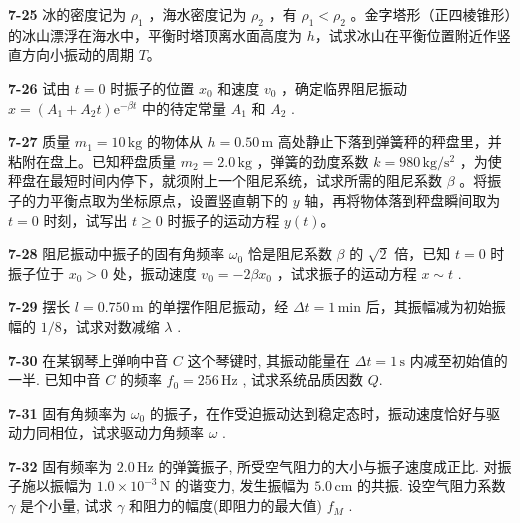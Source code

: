 \newpage

\textbf{7-25} 冰的密度记为 $\rho_{1}$ ，海水密度记为 $\rho_{2}$ ，有 $\rho_{1}<\rho_{2}$ 。金字塔形（正四棱锥形）的冰山漂浮在海水中，平衡时塔顶离水面高度为 $h$，试求冰山在平衡位置附近作竖直方向小振动的周期 $T$。

\newpage

\textbf{7-26} 试由 $t=0$ 时振子的位置 $x_{0}$ 和速度 $v_{0}$ ，确定临界阻尼振动 $x=(A_{1}+A_{2}t)\mathrm{e}^{-\beta t}$ 中的待定常量 $A_{1}$ 和 $A_{2}$ .

\newpage

\textbf{7-27} 质量 $m_{1}=10\,\mathrm{kg}$ 的物体从 $h=0.50\,\mathrm m$ 高处静止下落到弹簧秤的秤盘里，并粘附在盘上。已知秤盘质量 $m_{2}=2.0\,\mathrm{kg}$ ，弹簧的劲度系数 $k=980\,\mathrm{kg/s^{2}}$ ，为使秤盘在最短时间内停下，就须附上一个阻尼系统，试求所需的阻尼系数 $\beta$ 。将振子的力平衡点取为坐标原点，设置竖直朝下的 $y$ 轴，再将物体落到秤盘瞬间取为 $t=0$ 时刻，试写出 $t\geqslant0$ 时振子的运动方程 $y(t)$。

\newpage

\textbf{7-28} 阻尼振动中振子的固有角频率 $\omega_0$ 恰是阻尼系数 $\beta$ 的 $\sqrt{2}$ 倍，已知 $t = 0$ 时振子位于 $x_0 > 0$ 处，振动速度 $v_0 = -2\beta x_0$ ，试求振子的运动方程 $x \sim t$ .

\newpage

\textbf{7-29} 摆长 $l=0.750\,\mathrm m$ 的单摆作阻尼振动，经 $\Delta t=1\,\mathrm{min}$ 后，其振幅减为初始振幅的 $1/8$，试求对数减缩 $\lambda$ .

\newpage

\textbf{7-30} 在某钢琴上弹响中音 $C$ 这个琴键时, 其振动能量在 $\Delta t = 1\,\mathrm s$ 内减至初始值的一半. 已知中音 $C$ 的频率 $f_{0} = 256\,\mathrm{Hz}$ , 试求系统品质因数 $Q$.

\newpage

\textbf{7-31} 固有角频率为 $\omega_{0}$ 的振子，在作受迫振动达到稳定态时，振动速度恰好与驱动力同相位，试求驱动力角频率 $\omega$ .

\newpage

\textbf{7-32} 固有频率为 $2.0\,\mathrm{Hz}$ 的弹簧振子, 所受空气阻力的大小与振子速度成正比. 对振子施以振幅为 $1.0 \times 10^{-3}\,\mathrm N$ 的谐变力, 发生振幅为 $5.0\,\mathrm{cm}$ 的共振. 设空气阻力系数 $\gamma$ 是个小量, 试求 $\gamma$ 和阻力的幅度(即阻力的最大值) $f_{M}$ .

